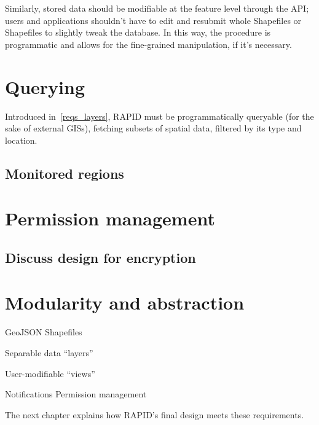 Similarly, stored data should be modifiable at the feature level through the API; users and applications shouldn't have to edit and resubmit whole Shapefiles or Shapefiles to slightly tweak the database. In this way, the procedure is programmatic and allows for the fine-grained manipulation, if it's necessary.

\section{Querying}

Introduced in~\ref{reqs_layers}, RAPID must be programmatically queryable (for the sake of external GISs), fetching subsets of spatial data, filtered by its type and location.

\subsection{Monitored regions}


\section{Permission management}

\subsection{Discuss design for encryption}

\section{Modularity and abstraction}





GeoJSON
Shapefiles


Separable data ``layers''

User-modifiable ``views''


Notifications
Permission management


The next chapter explains how RAPID's final design meets these requirements.

